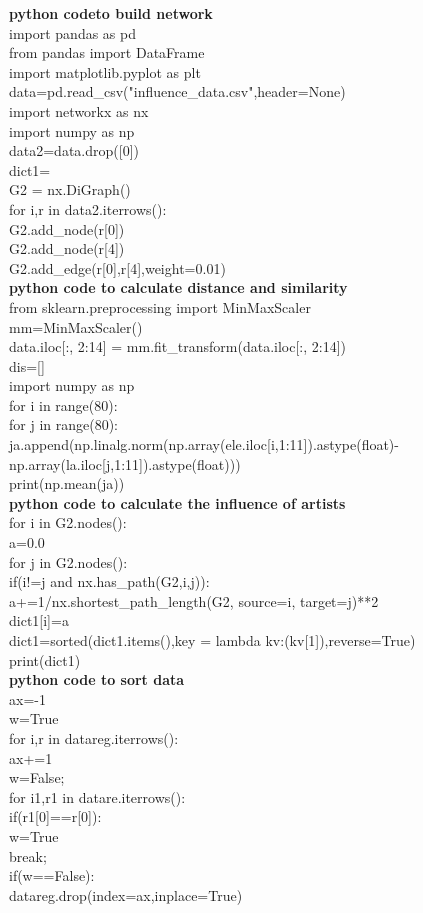 \documentclass[12pt]{article}
\begin{document}
\textbf{python codeto build network}\\
 import pandas as pd\\
from pandas import DataFrame\\
import matplotlib.pyplot as plt\\
data=pd.read\_csv("influence\_data.csv",header=None)\\
import networkx as nx\\
import numpy as np\\
data2=data.drop([0])\\
dict1={}\\
G2 = nx.DiGraph()\\
for i,r in data2.iterrows():\\
\quad    G2.add\_node(r[0])\\
\quad    G2.add\_node(r[4])\\
\quad    G2.add\_edge(r[0],r[4],weight=0.01)\\
\textbf{python code to calculate distance and similarity}\\
from sklearn.preprocessing import MinMaxScaler\\
mm=MinMaxScaler()\\
data.iloc[:, 2:14] = mm.fit\_transform(data.iloc[:, 2:14])\\
dis=[]\\
import numpy as np\\
for i in range(80):\\
    for j in range(80):\\
        ja.append(np.linalg.norm(np.array(ele.iloc[i,1:11]).astype(float)-np.array(la.iloc[j,1:11]).astype(float)))\\
print(np.mean(ja))\\
\textbf{python code to calculate the influence of artists}\\
for i in G2.nodes():\\
    a=0.0\\
    for j in G2.nodes():\\
        if(i!=j and nx.has\_path(G2,i,j)):\\
            a+=1/nx.shortest\_path\_length(G2, source=i, target=j)**2\\
    dict1[i]=a\\
dict1=sorted(dict1.items(),key = lambda kv:(kv[1]),reverse=True)\\
print(dict1)\\


\textbf{python code to sort data}\\
ax=-1\\
w=True\\
for i,r in datareg.iterrows():\\
    ax+=1\\
    w=False;\\
    for i1,r1 in datare.iterrows():\\
        if(r1[0]==r[0]):\\
            w=True\\
            break;\\
    if(w==False):\\
        datareg.drop(index=ax,inplace=True)\\
\end{document}
